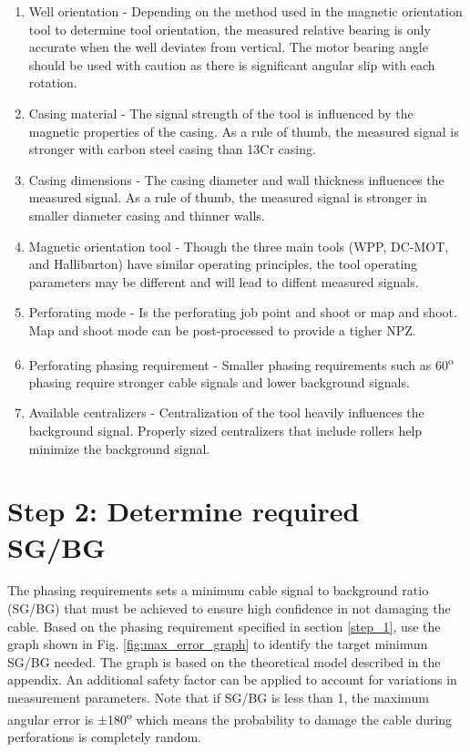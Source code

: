 \documentclass[paper=a4, fontsize=11pt]{scrartcl}
\numberwithin{equation}{section}		%
\numberwithin{figure}{section}			%
\numberwithin{table}{section}				%
\begin{document}
\begin{enumerate}
	\item Well orientation - Depending on the method used in the magnetic orientation tool to determine tool orientation, the measured relative bearing is only accurate when the well deviates from vertical.  The motor bearing angle should be used with caution as there is significant angular slip with each rotation. 
	\item Casing material - The signal strength of the tool is influenced by the magnetic properties of the casing.  As a rule of thumb, the measured signal is stronger with carbon steel casing than 13Cr casing.
	\item Casing dimensions - The casing diameter and wall thickness influences the measured signal.  As a rule of thumb, the measured signal is stronger in smaller diameter casing and thinner walls.
	\item Magnetic orientation tool - Though the three main tools (WPP, DC-MOT, and Halliburton) have similar operating principles, the tool operating parameters may be different and will lead to diffent measured signals.
	\item Perforating mode - Is the perforating job point and shoot or map and shoot.  Map and shoot mode can be post-processed to provide a tigher NPZ.
	\item Perforating phasing requirement - Smaller phasing requirements such as 60\textsuperscript{o} phasing require stronger cable signals and lower background signals.  
	\item Available centralizers - Centralization of the tool heavily influences the background signal.  Properly sized centralizers that include rollers help minimize the background signal.  
\end{enumerate}

\section{Step 2: Determine required SG/BG}\label{section:required_sgbg}
The phasing requirements sets a minimum cable signal to background ratio (SG/BG) that must be achieved to ensure high confidence in not damaging the cable.  Based on the phasing requirement specified in section \ref{step_1}, use the graph shown in Fig. \ref{fig:max_error_graph} to identify the target minimum SG/BG needed.  The graph is based on the theoretical model described in the appendix.  An additional safety factor can be applied to account for variations in measurement parameters.  Note that if SG/BG is less than 1, the maximum angular error is $\pm$180\textsuperscript{o} which means the probability to damage the cable during perforations is completely random.  
\end{document}
